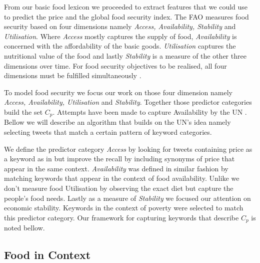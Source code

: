 \documentclass[12pt]{report}
\begin{document}
From our basic food lexicon we proceeded to extract features that we could use to predict the price and the global food security index. The FAO measures food security based on four dimensions namely \emph{Access, Availability, Stability} and \emph{Utilisation}. Where \emph{Access} mostly captures the supply of food, \emph{Availability} is concerned with the affordability of the basic goods. \emph{Utilisation} captures the nutritional value of the food and lastly \emph{Stability} is a measure of the other three dimensions over time. For food security objectives to be realised, all four dimensions must be fulfilled simultaneously \cite{fao2008}. 


To model food security we focus our work on those four dimension namely \emph{Access, Availability, Utilisation} and \emph{Stability}. Together those predictor categories build the set $C_p$. Attempts have been made to capture Availability by the UN \cite{ungp2013}. Bellow we will describe an algorithm that builds on the UN's idea namely selecting tweets that match a certain pattern of keyword categories. 


We define the predictor category \emph{Access} by looking for tweets containing price as a keyword as in \cite{ungp2013} but improve the recall by including synonyms of price that appear in the same context. \emph{Availability} was defined in similar fashion by matching keywords that appear in the context of food availability. Unlike \cite{AbbarMW14} we don't measure food Utilisation by observing the exact diet but capture the people's food needs. Lastly as a measure of \emph{Stability} we focused our attention on economic stability. Keywords in the context of  poverty were selected to match this predictor category. Our framework for capturing keywords that describe $C_p$ is noted bellow. 


\subsection{Food in Context}
\label{subsec:hal}
\end{document}
